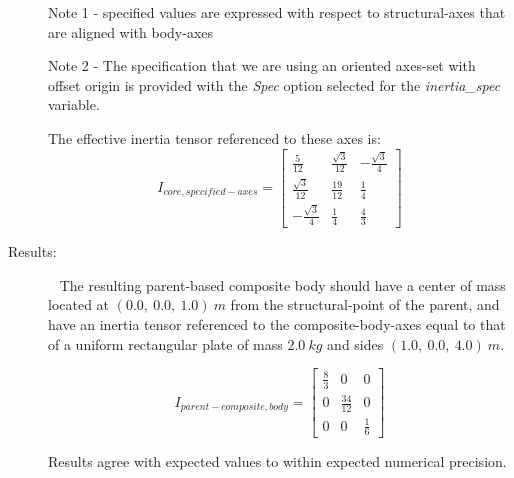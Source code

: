 \begin{description}
Note 1 - specified values are expressed with respect to structural-axes that
are aligned with body-axes

Note 2 - The specification that we are using an oriented axes-set with offset
origin is provided with the \textit{Spec} option selected for the
\textit{inertia\_spec} variable.

 The effective inertia tensor referenced to these axes is:
 \begin{equation*}
I_{core, specified-axes} =
   \begin{bmatrix} \frac{5}{12} & \frac{\sqrt{3}}{12}   & -\frac{\sqrt{3}}{4}
   \\
                   \frac{\sqrt{3}}{12}   & \frac{19}{12} & \frac{1}{4}   \\
                    -\frac{\sqrt{3}}{4}  & \frac{1}{4}   & \frac{4}{3}
   \end{bmatrix}
\end{equation*}



\item[Results:]\ \newline
The resulting parent-based composite body should have a center of mass located
at $(0.0,~0.0,~1.0)~m$ from the structural-point of the parent, and have an
inertia tensor referenced to the composite-body-axes equal to that of a
uniform rectangular plate of mass $2.0~kg$ and sides $(1.0,~0.0,~4.0)~m$.

\begin{equation*}
I_{parent-composite,body} =
   \begin{bmatrix} \frac{8}{3} & 0   & 0  \\
                   0   & \frac{34}{12} & 0   \\
                    0  & 0   & \frac{1}{6}
   \end{bmatrix}
\end{equation*}

Results agree with expected values to within expected numerical precision.
\end{description}


















